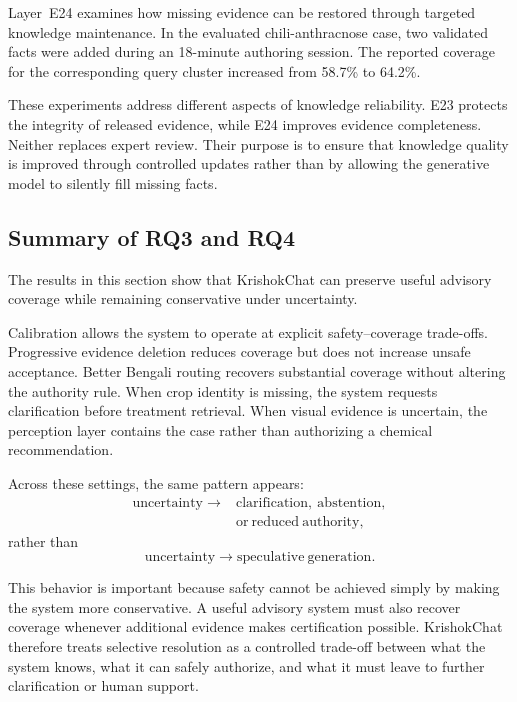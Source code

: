 \documentclass[a4paper,fleqn]{cas-dc}
\begin{document}
Layer~E24 examines how missing evidence can be restored through targeted knowledge maintenance. In the evaluated chili-anthracnose case, two validated facts were added during an 18-minute authoring session. The reported coverage for the corresponding query cluster increased from 58.7\% to 64.2\%.

These experiments address different aspects of knowledge reliability. E23 protects the integrity of released evidence, while E24 improves evidence completeness. Neither replaces expert review. Their purpose is to ensure that knowledge quality is improved through controlled updates rather than by allowing the generative model to silently fill missing facts.

\subsection{Summary of RQ3 and RQ4}

The results in this section show that KrishokChat can preserve useful advisory coverage while remaining conservative under uncertainty.

Calibration allows the system to operate at explicit safety--coverage trade-offs. Progressive evidence deletion reduces coverage but does not increase unsafe acceptance. Better Bengali routing recovers substantial coverage without altering the authority rule. When crop identity is missing, the system requests clarification before treatment retrieval. When visual evidence is uncertain, the perception layer contains the case rather than authorizing a chemical recommendation.

Across these settings, the same pattern appears:
\begin{equation}
\begin{aligned}
\mathrm{uncertainty} \longrightarrow {} & \mathrm{clarification,\ abstention,} \\
& \mathrm{or\ reduced\ authority},
\end{aligned}
\end{equation}
rather than
\begin{equation}
\mathrm{uncertainty} \longrightarrow \mathrm{speculative\ generation}.
\end{equation}

This behavior is important because safety cannot be achieved simply by making the system more conservative. A useful advisory system must also recover coverage whenever additional evidence makes certification possible. KrishokChat therefore treats selective resolution as a controlled trade-off between what the system knows, what it can safely authorize, and what it must leave to further clarification or human support.
\end{document}
